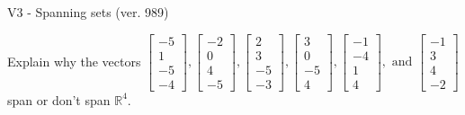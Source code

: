 \begin{exercise}
  \begin{exerciseTitle}V3 - Spanning sets (ver. 989)\end{exerciseTitle}
  \begin{exerciseStatement}
    Explain why the vectors \(\left[\begin{array}{r}
-5 \\
1 \\
-5 \\
-4
\end{array}\right] , \left[\begin{array}{r}
-2 \\
0 \\
4 \\
-5
\end{array}\right] , \left[\begin{array}{r}
2 \\
3 \\
-5 \\
-3
\end{array}\right] , \left[\begin{array}{r}
3 \\
0 \\
-5 \\
4
\end{array}\right] , \left[\begin{array}{r}
-1 \\
-4 \\
1 \\
4
\end{array}\right] , \text{ and } \left[\begin{array}{r}
-1 \\
3 \\
4 \\
-2
\end{array}\right]\) span or don't span \(\mathbb{R}^4\). 
	



\end{exerciseStatement}
\end{exercise}
